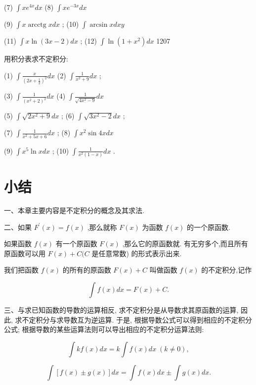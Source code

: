 \documentclass[lang=cn,newtx,12pt,scheme=chinese]{elegantbook}
\begin{document}
\begin{problemset}[习 题 十 四]
(7) \(\int x{e}^{4x}{dx}\) (8) \(\int x{e}^{-{3x}}{dx}\)

(9) \(\int x\operatorname{arcctg}{xdx}\) ; (10) \(\int \arcsin {xdxy}\)

(11) \(\int x\ln \left( {{3x} - 2}\right) {dx}\) ; (12) \(\int \ln \left( {1 + {x}^{2}}\right) {dx}\) 1207

\item * 用积分表求不定积分:

(1) \(\int \frac{x}{{\left( 2x + \frac{1}{2}\right) }^{2}}{dx}\) (2) \(\int \frac{1}{{x}^{2} + 9}{dx}\) ;

(3) \(\int \frac{1}{{\left( {x}^{2} + 2\right) }^{2}}{dx}\) (4) \(\int \frac{1}{\sqrt{4{x}^{2} - 9}}{dx}\)

(5) \(\int \sqrt{2{x}^{2} + 9}{dx}\) ; (6) \(\int \sqrt{3{x}^{2} - 2}{dx}\) ;

(7) \(\int \frac{1}{{x}^{2} + {5x} + 6}{dx}\) ; (8) \(\int {x}^{2}\sin {4xdx}\)

(9) \(\int {x}^{5}\ln {xdx}\) ; (10) \(\int \frac{1}{{x}^{2}\left( {1 - x}\right) }{dx}\) .

\end{problemset}

\chapter*{小结}

一、本章主要内容是不定积分的概念及其求法.

二、如果 \({F}^{\prime }\left( x\right) = f\left( x\right)\) ,那么就称 \(F\left( x\right)\) 为函数 \(f\left( x\right)\) 的一个原函数.

如果函数 \(f\left( x\right)\) 有一个原函数 \(F\left( x\right)\) ,那么它的原函数就. 有无穷多个,而且所有原函数可以用 \(F\left( x\right) + C(C\) 是任意常数) 的形式表示出来.

我们把函数 \(f\left( x\right)\) 的所有的原函数 \(F\left( x\right) + C\) 叫做函数 \(f\left( x\right)\) 的不定积分,记作

\[
\int f\left( x\right) {dx} = F\left( x\right) + C.
\]

三、与求已知函数的导数的运算相反, 求不定积分是从导数求其原函数的运算, 因此, 求不定积分与求导数互为逆运算. 于是, 根据导数公式可以得到相应的不定积分公式; 根据导数的某些运算法则可以导出相应的不定积分运算法则:

\[
\int {kf}\left( x\right) {dx} = k\int f\left( x\right) {dx}\;\left( {k \neq 0}\right) ,
\]

\[
\int \left\lbrack {f\left( x\right) \pm g\left( x\right) }\right\rbrack {dx} = \int f\left( x\right) {dx} \pm \int g\left( x\right) {dx}.
\]
\end{document}

